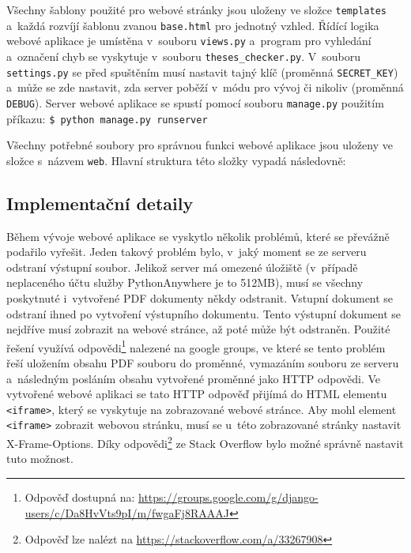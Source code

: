 Všechny šablony použité pro webové stránky jsou uloženy ve
složce \texttt{templates} a~každá rozvíjí šablonu zvanou \texttt{base.html}
pro jednotný vzhled. Řídící logika webové aplikace je umístěna v~souboru
\texttt{views.py} a~program pro vyhledání a~označení chyb se vyskytuje 
v~souboru \texttt{theses\_checker.py}. V~souboru \texttt{settings.py}
se před spuštěním musí nastavit tajný klíč (proměnná \texttt{SECRET\_KEY}) 
a~může se zde nastavit, zda server poběží v~módu pro vývoj či nikoliv
(proměnná \texttt{DEBUG}). Server webové aplikace se spustí
pomocí souboru \texttt{manage.py} použitím
příkazu: \verb|$ python manage.py runserver|

Všechny potřebné soubory pro správnou funkci webové aplikace jsou uloženy
ve složce s~názvem \texttt{web}. Hlavní struktura této složky vypadá následovně:




\subsection*{Implementační detaily}
Během vývoje webové aplikace se vyskytlo několik problémů, které se převážně
podařilo vyřešit. Jeden takový problém bylo, v~jaký moment se ze serveru odstraní
výstupní soubor. Jelikož server má omezené úložiště (v~případě neplaceného účtu
služby PythonAnywhere je to 512\;MB), musí se všechny poskytnuté i~vytvořené PDF
dokumenty někdy odstranit. Vstupní dokument se odstraní ihned po vytvoření
výstupního dokumentu. Tento výstupní dokument se nejdříve musí zobrazit na
webové stránce, až poté může být odstraněn. Použité řešení využívá
odpovědi\footnote{
    Odpověď dostupná na:
    \href{https://groups.google.com/g/django-users/c/Da8HvVts9pI/m/fwgaFj8RAAAJ}{https://groups.google.com/g/django-users/c/Da8HvVts9pI/m/fwgaFj8RAAAJ}
} nalezené na google groups, ve které se tento problém řeší uložením
obsahu PDF souboru do proměnné, vymazáním souboru ze serveru a~následným posláním 
obsahu vytvořené proměnné jako HTTP odpovědi. Ve vytvořené webové aplikaci se tato
HTTP odpověď přijímá do HTML elementu \texttt{<iframe>}, který se vyskytuje na
zobrazované webové stránce. Aby mohl element \texttt{<iframe>} zobrazit webovou
stránku, musí se u~této zobrazované stránky nastavit X-Frame-Options. Díky
odpovědi\footnote{
    Odpověď lze nalézt na 
    \href{https://stackoverflow.com/a/33267908}{https://stackoverflow.com/a/33267908}
} ze Stack Overflow bylo možné správně nastavit tuto možnost. 

